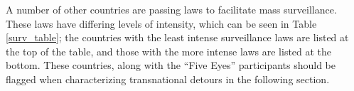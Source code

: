 A number of other countries are passing laws to facilitate mass surveillance.  These laws have differing levels of intensity, which can be seen in Table \ref{surv_table}; the countries with the least intense surveillance laws are listed at the top of the table, and those with the more intense laws are listed at the bottom.  These countries, along with the ``Five Eyes'' participants should be flagged when characterizing transnational detours in the following section.





